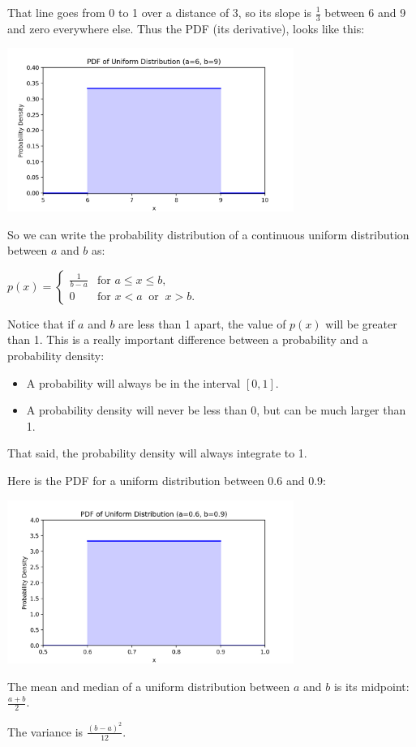 That line goes from 0 to 1 over a distance of 3,   so its slope is $\frac{1}{3}$ between 6 and  9 and zero everywhere else.   Thus the PDF (its derivative),  looks like this:

\includegraphics[width=0.7\textwidth]{unif_pdf.png}

So we can write the probability distribution of a continuous uniform distribution between $a$ and $b$ as:

  $p(x) = \begin{cases}
  \frac{1}{b-a} & \text{for } a \le x \le b, \\[8pt]
  0 & \text{for } x < a \ \text{ or } \ x > b.
  \end{cases}$

Notice that if $a$ and $b$ are less than 1 apart,  the value of $p(x)$ will be greater than 1.  This is a really important difference between a probability and a probability density: 
\begin{itemize}
\item A probability will always be in  the interval $[0, 1]$.  
\item A probability density will never be less than 0,  but can be much larger than 1.
\end{itemize}

That said,  the probability density will always integrate to 1.

Here is the PDF for a uniform distribution between 0.6 and 0.9:

\includegraphics[width=0.7\textwidth]{unif_pdf2.png}

The mean and median of a uniform distribution between $a$ and $b$ is its midpoint:  $\frac{a+b}{2}$.

The variance is $\frac{(b -a)^2}{12}$.


